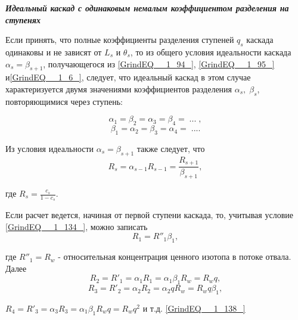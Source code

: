 
\textbf{\textit{Идеальный каскад с одинаковым немалым коэффициентом разделения на ступенях }}

Если принять, что полные коэффициенты разделения ступеней $q_{s} $ каскада одинаковы и не зависят от $L_{s} $ и $\theta _{s} $, то из общего условия идеальности каскада $\alpha _{s} =\beta _{s+1} $, получающегося из \ref{GrindEQ__1_94_}, \ref{GrindEQ__1_95_} и\ref{GrindEQ__1_6_}, следует, что идеальный каскад в этом случае характеризуется двумя значениями коэффициентов разделения $\alpha _{s} ,\; \beta _{s} $, повторяющимися через ступень:

\begin{equation} \label{GrindEQ__1_132_} 
\alpha _{1} =\beta _{2} =\alpha _{3} =\beta _{4} =\; ...\; , 
\end{equation} 
\begin{equation} \label{GrindEQ__1_133_} 
\beta _{1} =\alpha _{2} =\beta _{3} =\alpha _{4} =\; .... 
\end{equation} 

Из условия идеальности $\alpha _{s} =\beta _{s+1} $ также следует, что
\begin{equation} \label{GrindEQ__1_134_} 
R_{s} =\alpha _{s-1} R_{s-1} =\frac{R_{s+1} }{\beta _{s+1} } ,                              
\end{equation} 

где   $R_{s} =\frac{c_{s} }{1-c_{s} } $.

Если расчет ведется, начиная от первой ступени каскада, то, учитывая условие \ref{GrindEQ__1_134_}, можно записать
\begin{equation} \label{GrindEQ__1_135_} 
R_{1} =R''_{1} \beta _{1} ,          
\end{equation} 

где $R''_{1} =R_{w} $ - относительная концентрация ценного изотопа в потоке отвала. Далее
\begin{equation} \label{GrindEQ__1_136_} 
R_{2} =R'_{1} =\alpha _{1} R_{1} =\alpha _{1} \beta _{1} R_{w} =R_{w} q,  
\end{equation} 
\begin{equation} \label{GrindEQ__1_137_} 
R_{3} =R'_{2} =\alpha _{2} R_{2} =\alpha _{2} qR_{w} =R_{w} q\beta _{1} ,  
\end{equation} 

$R_{4} =R'_{3} =\alpha _{3} R_{3} =\alpha _{1} \beta _{1} R_{w} q=R_{w} q^{2} $ и т.д. \ref{GrindEQ__1_138_}

